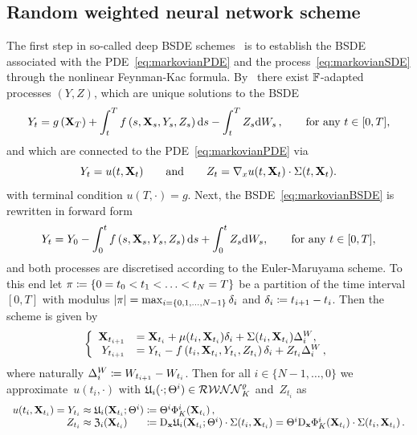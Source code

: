 \subsection{Random weighted neural network scheme}
The first step in so-called deep BSDE schemes~\cite{E2017DeepEquations, Han2018SolvingLearning, Hure2020DeepPDEs} is to establish the BSDE associated with the PDE~\eqref{eq:markovianPDE} and the process~\eqref{eq:markovianSDE} through the nonlinear Feynman-Kac formula. By~\cite{Pardoux1990AdaptedEquation} there exist $\mathbb{F}$-adapted processes $(Y, Z)$, which are unique solutions to the BSDE
\begin{equation}\label{eq:markovianBSDE}
Y_{t}=g\left(\mathbf{X}_{T}\right)+\int_{t}^{T} f\left(s, \mathbf{X}_{s}, Y_{s}, Z_{s}\right) \mathrm{d} s-\int_{t}^{T} Z_{s} \mathrm{d} W_{s}\,,
\qquad\text{for any } t \in [0,T],
\end{equation}
and which are connected to the PDE~\eqref{eq:markovianPDE} via
$$
Y_t = u(t, \mathbf{X}_t) \qquad \text{and} \qquad Z_t = \nabla_x u(t,\mathbf{X}_t)\cdot\Sigma(t,\mathbf{X}_t).  
$$
with terminal condition $u(T, \cdot)=g$. Next, the BSDE~\eqref{eq:markovianBSDE} is rewritten in forward form
\begin{equation*}
    Y_{t}=Y_0 - \int_{0}^{t} f\left(s, \mathbf{X}_{s}, Y_{s}\textbf{}, Z_{s}\right) \mathrm{d} s + \int_{0}^{t} Z_{s} \mathrm{d} W_{s}\textbf{},
\qquad\text{for any }t \in [0,T]\textbf{},
\end{equation*}
and both processes are discretised according to the Euler-Maruyama scheme. To this end let $\pi\coloneqq \left\{0=t_{0}<t_{1}<\ldots<t_{N}=T\right\}$ be a partition of the time interval $[0,T]$ with modulus $|\pi|=\max_{i=\{0,1, \dots, N-1\}} \delta_{i} $ and $\delta_{i} \coloneqq  t_{i+1}-t_{i}$. Then the scheme is given by
\begin{equation}\label{eq:EulerMaruyama}
\left\{
\begin{array}{rl}
    \mathbf{X}_{t_{i+1}} &= \mathbf{X}_{t_{i}} + \mu(t_{i}, \mathbf{X}_{t_{i}})\delta_{i}  + \Sigma(t_{i}, \mathbf{X}_{t_{i}})\Delta^{W}_{i}\textbf{}, \\
    Y_{t_{i+1}} &= Y_{t_{i}} - f\left(t_{i}, \mathbf{X}_{t_{i}}, Y_{t_{i}}, Z_{t_i}\right)\delta_{i} + Z_{t_i}\Delta^{W}_{i}\,,
\end{array}
\right.
\end{equation}
where naturally $\Delta^{W}_{i}\coloneqq  W_{t_{i+1}} - W_{t_i}$.
Then for all $i\in\{N-1,\dots,0\}$ we approximate~$u(t_i,\cdot)$ with $\mathfrak{U}_i(\cdot;\Theta^i)\in\mathcal{RWNN}_{K}^\varrho$ 
and~$Z_{t_i}$ as
\begin{equation*}
\begin{array}{rll}
u(t_i,\XX_{t_i}) = Y_{t_i}
&\hspace*{-0.25cm}\approx \Uf_i(\XX_{t_i};\Theta^i)
&\hspace*{-0.25cm}\defEqual\Theta^i \Phi_K^i(\XX_{t_i})\,,\\
Z_{t_i} &\hspace*{-0.25cm}\approx \Zf_{i}(\XX_{t_i}) 
&\hspace*{-0.25cm}\defEqual \Dxx \Uf_i(\XX_{t_i};\Theta^i)\cdot\Sigma(t_i,\XX_{t_i})
 = \Theta^i \Dxx \Phi_K^i(\XX_{t_i})\cdot\Sigma(t_i,\XX_{t_i})\,.
 \end{array}
\end{equation*}
